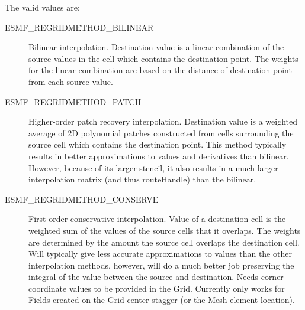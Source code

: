 The valid values are:
\begin{description}
\item [ESMF\_REGRIDMETHOD\_BILINEAR]
      Bilinear interpolation. Destination value is a linear combination of the source values in the cell which contains the destination point. The weights for the linear combination are based on the distance of destination point from each source value. 
\item [ESMF\_REGRIDMETHOD\_PATCH]
      Higher-order patch recovery interpolation. Destination value is a weighted average of 2D polynomial patches constructed from cells surrounding the source cell which contains the destination point. This method typically results in better approximations to values and derivatives than bilinear. However, because of its larger stencil, it also results in a much larger interpolation matrix (and thus routeHandle) than the bilinear. 
\item [ESMF\_REGRIDMETHOD\_CONSERVE]
      First order conservative interpolation. Value of a destination cell is the weighted sum of the values of the source cells that it overlaps. The weights are determined by the amount the source cell overlaps the destination cell. Will typically give less accurate approximations to values than the other interpolation methods, however, will do a much better job preserving the integral of the value between the source and destination.  Needs corner coordinate values to be provided in the Grid. Currently only works for Fields created on the Grid center stagger (or the Mesh element location). 
\end{description}
